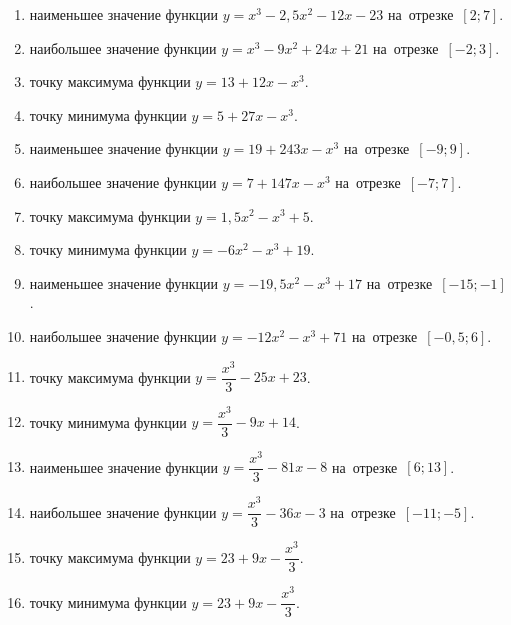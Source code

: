 \documentclass[a4paper,10pt]{article}
\begin{document}
\begin{enumerate}
\item {} наименьшее значение функции $y=x^3 -2,5x^2-12x-23$ на~отрезке~$\left[2;7\right]$.

\item {} наибольшее значение функции $y=x^3 -9x^2+24x+21$ на~отрезке~$\left[-2;3\right]$.

\item {} точку максимума функции $y=13+12x-x^3$.

\item {} точку минимума функции $y=5+27x-x^3$.

\item {} наименьшее значение функции $y=19+243x-x^3$ на~отрезке~$\left[-9;9\right]$.

\item {} наибольшее значение функции $y=7+147x-x^3$ на~отрезке~$\left[-7;7\right]$.

\item {} точку максимума функции $y=1,5x^2-x^3+5$.

\item {} точку минимума функции $y=-6x^2-x^3+19$.

\item {} наименьшее значение функции $y=-19,5x^2-x^3+17$ на~отрезке~$\left[-15;-1\right]$.

\item {} наибольшее значение функции $y=-12x^2-x^3+71$ на~отрезке~$\left[-0,5;6\right]$.

\item {} точку максимума функции $y=\dfrac{x^3}{3} -25x+23$.

\item {} точку минимума функции $y=\dfrac{x^3}{3} -9x+14$.

\item {} наименьшее значение функции $y=\dfrac{x^3}{3} -81x-8$ на~отрезке~$\left[6;13\right]$.

\item {} наибольшее значение функции $y=\dfrac{x^3}{3} -36x-3$ на~отрезке~$\left[-11;-5\right]$.

\item {} точку максимума функции $y=23 +9x-\dfrac{x^3}{3}$.

\item {} точку минимума функции $y=23 +9x-\dfrac{x^3}{3}$.


\end{enumerate}
\end{document}
